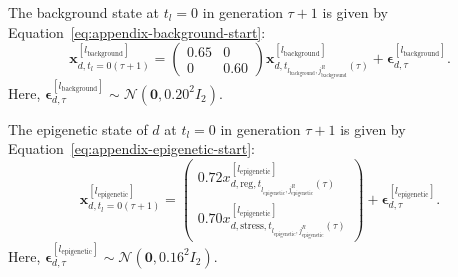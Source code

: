 \documentclass[11pt]{article}
\begin{document}
The background state at $t_l=0$ in generation $\tau+1$ is given by Equation~\ref{eq:appendix-background-start}:
\begin{equation}
\mathbf{x}^{[l_{\mathrm{background}}]}_{d,t_l=0(\tau+1)}
=
\begin{pmatrix}
0.65&0\\
0&0.60
\end{pmatrix}
\mathbf{x}^{[l_{\mathrm{background}}]}_{d,t_{l_{\mathrm{background}},j_{\mathrm{background}}^R}(\tau)}
+
\boldsymbol{\epsilon}^{[l_{\mathrm{background}}]}_{d,\tau}.
\label{eq:appendix-background-start}
\end{equation}
Here, $\boldsymbol{\epsilon}^{[l_{\mathrm{background}}]}_{d,\tau}\sim\mathcal{N}(\mathbf{0},0.20^2I_2)$.

The epigenetic state of $d$ at $t_l=0$ in generation $\tau+1$ is given by Equation~\ref{eq:appendix-epigenetic-start}:
\begin{equation}
\mathbf{x}^{[l_{\mathrm{epigenetic}}]}_{d,t_l=0(\tau+1)}
=
\begin{pmatrix}
0.72x^{[l_{\mathrm{epigenetic}}]}_{d,\mathrm{reg},t_{l_{\mathrm{epigenetic}},j_{\mathrm{epigenetic}}^R}(\tau)}\\
0.70x^{[l_{\mathrm{epigenetic}}]}_{d,\mathrm{stress},t_{l_{\mathrm{epigenetic}},j_{\mathrm{epigenetic}}^R}(\tau)}
\end{pmatrix}
+
\boldsymbol{\epsilon}^{[l_{\mathrm{epigenetic}}]}_{d,\tau}.
\label{eq:appendix-epigenetic-start}
\end{equation}
Here, $\boldsymbol{\epsilon}^{[l_{\mathrm{epigenetic}}]}_{d,\tau}\sim\mathcal{N}(\mathbf{0},0.16^2I_2)$.
\end{document}

